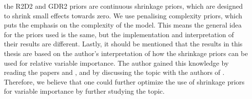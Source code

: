 the R2D2 and GDR2 priors are continuous shrinkage priors, which are designed to shrink small effects towards zero. We use penalising complexity priors, which puts the emphasis on the complexity of the model. This means the general idea for the priors used is the same, but the implementation and interpretation of their results are different. Lastly, it should be mentioned that the results in this thesis are based on the author's interpretation of how the shrinkage priors can be used for relative variable importance. The author gained this knowledge by reading the papers \citet{zhang2020bayesian} and \citet{aguilar2024generalized}, and by discussing the topic with the authors of \citet{aguilar2024generalized}. Therefore, we believe that one could further optimize the use of shrinkage priors for variable importance by further studying the topic.
\\
\\
